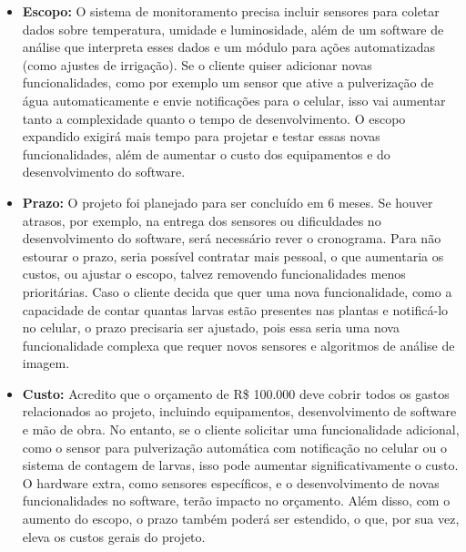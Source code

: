 \documentclass{article}
\begin{document}
	\begin{itemize}
		\item \textbf{Escopo:} O sistema de monitoramento precisa incluir sensores para coletar dados sobre temperatura, umidade e luminosidade, além de um software de análise que interpreta esses dados e um módulo para ações automatizadas (como ajustes de irrigação). Se o cliente quiser adicionar novas funcionalidades, como por exemplo um sensor que ative a pulverização de água automaticamente e envie notificações para o celular, isso vai aumentar tanto a complexidade quanto o tempo de desenvolvimento. O escopo expandido exigirá mais tempo para projetar e testar essas novas funcionalidades, além de aumentar o custo dos equipamentos e do desenvolvimento do software.
		
		\item \textbf{Prazo:} O projeto foi planejado para ser concluído em 6 meses. Se houver atrasos, por exemplo, na entrega dos sensores ou dificuldades no desenvolvimento do software, será necessário rever o cronograma. Para não estourar o prazo, seria possível contratar mais pessoal, o que aumentaria os custos, ou ajustar o escopo, talvez removendo funcionalidades menos prioritárias. Caso o cliente decida que quer uma nova funcionalidade, como a capacidade de contar quantas larvas estão presentes nas plantas e notificá-lo no celular, o prazo precisaria ser ajustado, pois essa seria uma nova funcionalidade complexa que requer novos sensores e algoritmos de análise de imagem.
		
		\item \textbf{Custo:} Acredito que o orçamento de R\$ 100.000 deve cobrir todos os gastos relacionados ao projeto, incluindo equipamentos, desenvolvimento de software e mão de obra. No entanto, se o cliente solicitar uma funcionalidade adicional, como o sensor para pulverização automática com notificação no celular ou o sistema de contagem de larvas, isso pode aumentar significativamente o custo. O hardware extra, como sensores específicos, e o desenvolvimento de novas funcionalidades no software, terão impacto no orçamento. Além disso, com o aumento do escopo, o prazo também poderá ser estendido, o que, por sua vez, eleva os custos gerais do projeto.
	\end{itemize}

	
\end{document}
